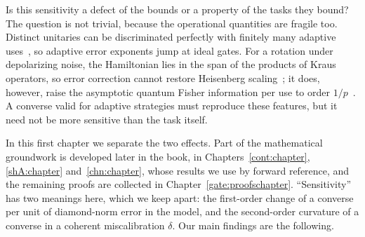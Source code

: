 Is this sensitivity a defect of the bounds or a property of the tasks they bound? The question is not trivial, because the operational quantities are fragile too. Distinct unitaries can be discriminated perfectly with finitely many adaptive uses~\cite{DuanFengYing2007}, so adaptive error exponents jump at ideal gates. For a rotation under depolarizing noise, the Hamiltonian lies in the span of the products of Kraus operators, so error correction cannot restore Heisenberg scaling~\cite{DemkowiczDobrzanski2012,DemkowiczDobrzanski2017,ZZPJ2018,ZhouJiang2021}; it does, however, raise the asymptotic quantum Fisher information per use to order $1/p$~\cite{ZhouJiang2021,Dur2014,Kessler2014}. A converse valid for adaptive strategies must reproduce these features, but it need not be more sensitive than the task itself.

In this first chapter we separate the two effects. Part of the mathematical groundwork is developed later in the book, in Chapters~\ref{cont:chapter}, \ref{shA:chapter} and~\ref{chn:chapter}, whose results we use by forward reference, and the remaining proofs are collected in Chapter~\ref{gate:proofschapter}.
``Sensitivity'' has two meanings here, which we keep apart: the first-order change of a converse per unit of diamond-norm error in the model, and the second-order curvature of a converse in a coherent miscalibration $\delta$. Our main findings are the following.
